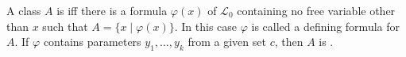 A class $A$ is  iff there is a formula $\varphi(x)$ of $\mathcal{L}_0$ containing no free variable other than $x$ such that $A = \{x \mid \varphi(x)\}$. In this case $\varphi$ is called a defining formula for $A$. If $\varphi$ contains parameters $y_1, \ldots, y_k$ from a given set $c$, then $A$ is .

